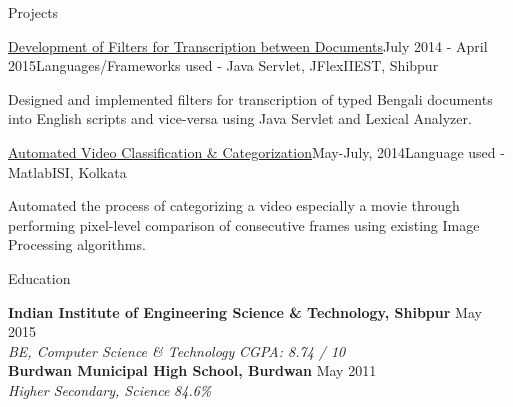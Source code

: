 \documentclass{resume}
\begin{document}

\begin{rSection}{Projects}

\begin{rSubsection}{\href{https://github.com/surajeet01/online-transcription}{Development of Filters for Transcription between Documents}}{}{July 2014 - April 2015}{Languages/Frameworks used - Java Servlet, JFlex}{IIEST, Shibpur}
\item Designed and implemented filters for transcription of typed Bengali documents into English scripts and vice-versa using Java Servlet and Lexical Analyzer.
\end{rSubsection}

\begin{rSubsection}{\href{https://github.com/surajeet01/movie-categorizarion}{Automated Video Classification \& Categorization}}{}{May-July, 2014}{Language used - Matlab}{ISI, Kolkata}{}
\item Automated the process of categorizing a video especially a movie through performing pixel-level comparison of consecutive frames using existing Image Processing algorithms.
\end{rSubsection}

\end{rSection}



\begin{rSection}{Education}

{\bf Indian Institute of Engineering Science \& Technology, Shibpur} \hfill May 2015 \\ 
{\em BE, Computer Science \& Technology} \hfill {\em CGPA: 8.74 / 10} \smallskip \smallskip \\
{\bf Burdwan Municipal High School, Burdwan} \hfill May 2011 \\ 
{\em Higher Secondary, Science} \hfill {\em 84.6\%} \\  

\end{rSection}

\end{document}
